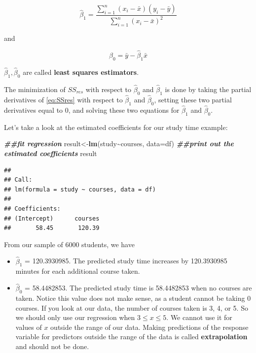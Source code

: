 \documentclass[
]{book}
\newenvironment{Shaded}{\begin{snugshade}}{\end{snugshade}}
\newcommand{\AttributeTok}[1]{\textcolor[rgb]{0.13,0.29,0.53}{#1}}
\newcommand{\DocumentationTok}[1]{\textcolor[rgb]{0.56,0.35,0.01}{\textbf{\textit{#1}}}}
\newcommand{\FunctionTok}[1]{\textcolor[rgb]{0.13,0.29,0.53}{\textbf{#1}}}
\newcommand{\NormalTok}[1]{#1}
\newcommand{\OtherTok}[1]{\textcolor[rgb]{0.56,0.35,0.01}{#1}}
\newcommand{\SpecialCharTok}[1]{\textcolor[rgb]{0.81,0.36,0.00}{\textbf{#1}}}
\providecommand{\tightlist}{%
  \setlength{\itemsep}{0pt}\setlength{\parskip}{0pt}}
\begin{document}
\begin{equation} 
\hat{\beta}_1 = \frac{\sum\limits_{i=1}^n(x_i-\bar{x})(y_i-\bar{y})}{\sum\limits_{i=1}^n(x_i-\bar{x})^2}
\label{eq:b1}
\end{equation}

and

\begin{equation} 
\hat{\beta}_0 = \bar{y}- \hat{\beta}_1 \bar{x}
\label{eq:b0}
\end{equation}

\(\hat{\beta}_1, \hat{\beta}_0\) are called \textbf{least squares estimators}.

The minimization of \(SS_{res}\) with respect to \(\hat{\beta}_0\) and \(\hat{\beta}_1\) is done by taking the partial derivatives of \eqref{eq:SSres} with respect to \(\hat{\beta}_1\) and \(\hat{\beta}_0\), setting these two partial derivatives equal to 0, and solving these two equations for \(\hat{\beta}_1\) and \(\hat{\beta}_0\).

Let's take a look at the estimated coefficients for our study time example:

\begin{Shaded}
\begin{Highlighting}[]
\DocumentationTok{\#\#fit regression}
\NormalTok{result}\OtherTok{\textless{}{-}}\FunctionTok{lm}\NormalTok{(study}\SpecialCharTok{\textasciitilde{}}\NormalTok{courses, }\AttributeTok{data=}\NormalTok{df)}
\DocumentationTok{\#\#print out the estimated coefficients}
\NormalTok{result}
\end{Highlighting}
\end{Shaded}

\begin{verbatim}
## 
## Call:
## lm(formula = study ~ courses, data = df)
## 
## Coefficients:
## (Intercept)      courses  
##       58.45       120.39
\end{verbatim}

From our sample of 6000 students, we have

\begin{itemize}
\tightlist
\item
  \(\hat{\beta}_1\) = 120.3930985. The predicted study time increases by 120.3930985 minutes for each additional course taken.
\item
  \(\hat{\beta}_0\) = 58.4482853. The predicted study time is 58.4482853 when no courses are taken. Notice this value does not make sense, as a student cannot be taking 0 courses. If you look at our data, the number of courses taken is 3, 4, or 5. So we should only use our regression when \(3 \leq x \leq 5\). We cannot use it for values of \(x\) outside the range of our data. Making predictions of the response variable for predictors outside the range of the data is called \textbf{extrapolation} and should not be done.
\end{itemize}
\end{document}
